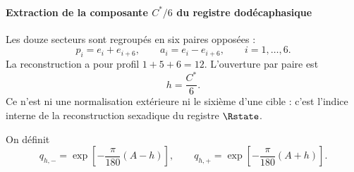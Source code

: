 \paragraph{Extraction de la composante \(C^*/6\) du registre dodécaphasique}

Les douze secteurs sont regroupés en six paires opposées :
\begin{equation}
p_i=e_i+e_{i+6},\qquad
a_i=e_i-e_{i+6},\qquad i=1,\ldots,6.
\label{eq:sexadic-pairs}
\end{equation}
La reconstruction a pour profil \(1+5+6=12\). L'ouverture par paire est
\begin{equation}
h=\frac{C^*}{6}.
\label{eq:h-C6}
\end{equation}
Ce n'est ni une normalisation extérieure ni le sixième d'une cible : c'est l'indice
interne de la reconstruction sexadique du registre \(\Rstate\).

On définit
\begin{equation}
q_{h,-}=\exp\left[-\frac\pi{180}(A-h)\right],
\qquad
q_{h,+}=\exp\left[-\frac\pi{180}(A+h)\right].
\label{eq:q-h}
\end{equation}

